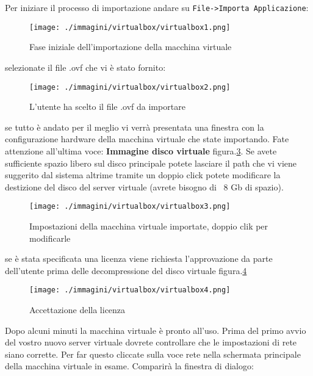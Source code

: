 Per iniziare il processo di importazione andare su \texttt{File->Importa Applicazione}:

\begin{figure}[H]
 \centering
 \texttt{[image: ./immagini/virtualbox/virtualbox1.png]}
 \caption{Fase iniziale dell'importazione della macchina virtuale}
 \label{fig:virtualbox-startimport}
\end{figure}

selezionate il file .ovf che vi è stato fornito:
\begin{figure}[H]
 \centering
 \texttt{[image: ./immagini/virtualbox/virtualbox2.png]}
 \caption{L'utente ha scelto il file .ovf da importare}
 \label{fig:virtualbox_scelta}
\end{figure}

se tutto è andato per il meglio vi verrà presentata una finestra con la configurazione hardware della macchina virtuale che state importando. Fate attenzione all'ultima voce: \textbf{Immagine disco virtuale} figura.\ref{fig:virtualbox_setup1}. Se avete sufficiente spazio libero sul disco principale potete lasciare il path che vi viene suggerito dal sistema altrime tramite un doppio click potete modificare la destizione del disco del server virtuale (avrete bisogno di ~8 Gb di spazio).

\begin{figure}[H]
 \centering
 \texttt{[image: ./immagini/virtualbox/virtualbox3.png]}
\caption{Impostazioni della macchina virtuale importate, doppio clik per modificarle}
\label{fig:virtualbox_setup1}
\end{figure}
se è stata specificata una licenza viene richiesta l'approvazione da parte dell'utente prima delle decompressione del disco virtuale figura.\ref{fig:virtualbox_licenza}
\begin{figure}[H]
 \centering
 \texttt{[image: ./immagini/virtualbox/virtualbox4.png]}
 \caption{Accettazione della licenza}
 \label{fig:virtualbox_licenza}
\end{figure}
Dopo alcuni minuti la macchina virtuale è pronto all'uso. Prima del primo avvio del vostro nuovo server virtuale dovrete controllare che le impostazioni di rete siano corrette. Per far questo cliccate sulla voce rete nella schermata principale della macchina virtuale in esame. Comparirà la finestra di dialogo:

